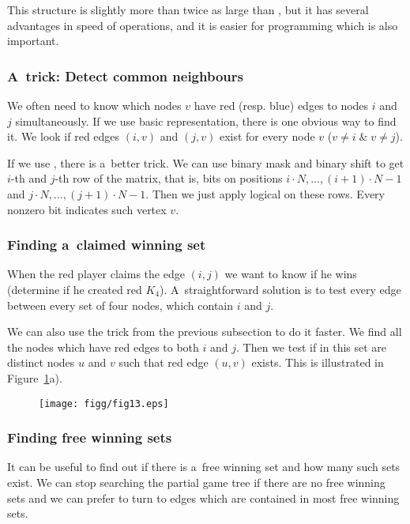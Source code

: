 This structure is slightly more than twice as large than , but it has
several advantages in speed of operations, and it is easier for programming which
is also important. 

\subsubsection{A~trick: Detect common neighbours}

We often need to know which nodes $v$ have red (resp. blue) edges to nodes $i$ and $j$
simultaneously. If we use basic representation, there is one obvious way to find it.
We look if red edges $(i,v)$ and $(j,v)$ exist for every node $v$ ($v \ne i \;
\& \; v \ne j$).

If we use , there is a~better trick. We can
use binary mask and binary shift to get $i$-th and $j$-th row of the matrix, that is, bits
on positions $i \cdot N, \ldots, (i\!+\!1)\! \cdot \!N\!-\!1$ and $j \cdot N, \ldots,
(j\!+\!1)\!\cdot\!N\!-\!1 $. Then we just apply logical  on these rows. Every nonzero bit
indicates such vertex $v$.

\subsubsection{Finding a~claimed winning set} 

When the red player claims the edge $(i,j)$ we want to know if he wins (determine if he
created red $K_4$). A~straightforward solution is to test every edge between every set
of four nodes, which contain $i$ and $j$. 

We can also use the trick from the previous subsection to do it faster. We find all
the nodes which have red edges to both $i$ and $j$. Then we test if in this
set are distinct nodes $u$ and $v$ such that red edge $(u,v)$ exists. This is illustrated
in Figure~\ref{trinact}a).

\begin{figure}
\centerline{\mbox{\texttt{[image: figg/fig13.eps]}}}
\caption{}
\label{trinact}
\end{figure}


\subsubsection{Finding free winning sets} \label{freeK4}

It can be useful to find out if there is a~free winning set 
and how many such sets exist. We can stop searching the partial game tree if
there are no free winning sets and we can prefer to turn to edges which are
contained in most free winning sets.

